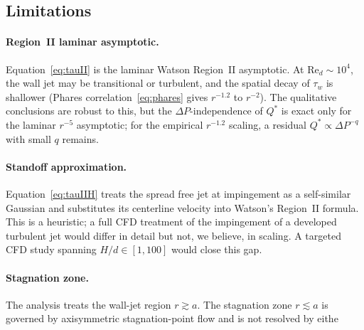 \documentclass[10pt,letterpaper]{article}
\newcommand{\Rey}{\mathrm{Re}}
\begin{document}
\subsection{Limitations}

\paragraph{Region~II laminar asymptotic.}
Equation~\eqref{eq:tauII} is the laminar Watson Region~II asymptotic.
At $\Rey_d \sim 10^4$, the wall jet may be transitional or turbulent,
and the spatial decay of $\tau_w$ is shallower (Phares
correlation~\eqref{eq:phares} gives $r^{-1.2}$ to $r^{-2}$). The
qualitative conclusions are robust to this, but the $\Delta P$-independence
of $Q^*$ is exact only for the laminar $r^{-5}$ asymptotic; for the
empirical $r^{-1.2}$ scaling, a residual $Q^* \propto \Delta P^{-q}$
with small $q$ remains.

\paragraph{Standoff approximation.}
Equation~\eqref{eq:tauIIH} treats the spread free jet at impingement as
a self-similar Gaussian and substitutes its centerline velocity into
Watson's Region~II formula. This is a heuristic; a full CFD treatment
of the impingement of a developed turbulent jet would differ in detail
but not, we believe, in scaling. A targeted CFD study spanning $H/d
\in [1, 100]$ would close this gap.

\paragraph{Stagnation zone.}
The analysis treats the wall-jet region $r \gtrsim a$. The stagnation
zone $r \lesssim a$ is governed by axisymmetric stagnation-point flow
and is not resolved by eithe
\end{document}

